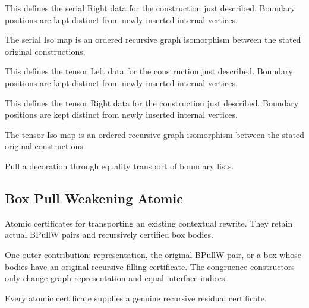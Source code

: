 This defines the serial Right data for the construction just described. Boundary positions are kept distinct from newly inserted internal vertices.
\par{}

The serial Iso map is an ordered recursive graph isomorphism between the stated original constructions.
\par{}

This defines the tensor Left data for the construction just described. Boundary positions are kept distinct from newly inserted internal vertices.
\par{}

This defines the tensor Right data for the construction just described. Boundary positions are kept distinct from newly inserted internal vertices.
\par{}

The tensor Iso map is an ordered recursive graph isomorphism between the stated original constructions.
\par{}

Pull a decoration through equality transport of boundary lists.
\par{}

\subsection{Box Pull Weakening Atomic}
Atomic certificates for transporting an existing contextual rewrite. They retain actual BPullW pairs and recursively certified box bodies.

One outer contribution: representation, the original BPullW pair, or a box whose bodies have an original recursive filling certificate. The congruence constructors only change graph representation and equal interface indices.
\par{}

Every atomic certificate supplies a genuine recursive residual certificate.
\par{}

